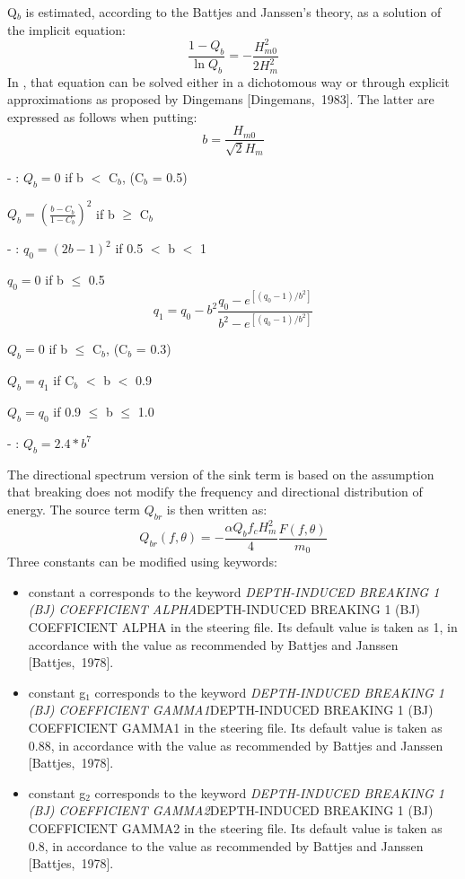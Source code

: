  Q${}_{b}$ is estimated, according to the Battjes and Janssen's theory, as a solution of the implicit equation:
\begin{equation} \label{GrindEQ__4_47_}
\frac{1-Q_{b} }{\ln Q_{b} } =-\frac{H_{m0}^{2} }{2H_{m}^{2} }
\end{equation}
In \tomawac, that equation can be solved either in a dichotomous way or through explicit approximations as proposed by Dingemans [Dingemans,~1983]. The latter are expressed as follows when putting:
\[b=\frac{H_{m0} }{\sqrt{2} H_{m} } \]

 - :  $Q_{b} =0$   if b $<$ C${}_{b}$, (C${}_{b}$ = 0.5)

 $Q_{b} =\left(\frac{b-C_{b} }{1-C_{b} } \right)^{2} $ if b $\geq$ C${}_{b}$

 - :  $q_{0} =\left(2b-1\right)^{2} $ if 0.5 $<$ b $<$ 1

 $q_{0} =0$ if b $\leq$ 0.5
\[q_{1} =q_{0} -b^{2} \frac{q_{0} -e^{\left[\left(q_{0} -1\right)/b^{2} \right]} }{b^{2} -e^{\left[\left(q_{0} -1\right)/b^{2} \right]} } \]

    $Q_{b} =0$   if b $\leq$ C${}_{b}$, (C${}_{b}$ = 0.3)

 $Q_{b} =q_{1} $  if C${}_{b}$ $<$ b $<$ 0.9

 $Q_{b} =q_{0} $  if 0.9 $\leq$ b $\leq$ 1.0

 - :  $Q_{b} =2.4*b^{7} $

 The directional spectrum version of the sink term is based on the assumption that breaking does not modify the frequency and directional distribution of energy. The source term $Q_{br} $ is then written as:
\begin{equation} \label{GrindEQ__4_48_}
Q_{br} \left(f,\theta \right)=-\frac{\alpha Q_{b} f_{c} H_{m}^{2} }{4} \frac{F\left(f,\theta \right)}{m_{0} }
\end{equation}
Three constants can be modified using keywords:

\begin{itemize}
\item  constant a corresponds to the keyword \textit{DEPTH-INDUCED BREAKING 1 (BJ) COEFFICIENT ALPHA}DEPTH-INDUCED BREAKING 1 (BJ) COEFFICIENT ALPHA\textit{ }in the steering file. Its default value is taken as 1, in accordance with the value as recommended by Battjes and Janssen [Battjes,~1978].

\item  constant g${}_{1}$ corresponds to the keyword \textit{DEPTH-INDUCED BREAKING 1 (BJ) COEFFICIENT GAMMA1}DEPTH-INDUCED BREAKING 1 (BJ) COEFFICIENT GAMMA1\textit{ }in the steering file. Its default value is taken as 0.88, in accordance with the value as recommended by Battjes and Janssen [Battjes,~1978].

\item  constant g${}_{2}$ corresponds to the keyword \textit{DEPTH-INDUCED BREAKING 1 (BJ) COEFFICIENT GAMMA2}DEPTH-INDUCED BREAKING 1 (BJ) COEFFICIENT GAMMA2\textit{ }in the steering file. Its default value is taken as 0.8, in accordance to the value as recommended by Battjes and Janssen [Battjes,~1978].
\end{itemize}

